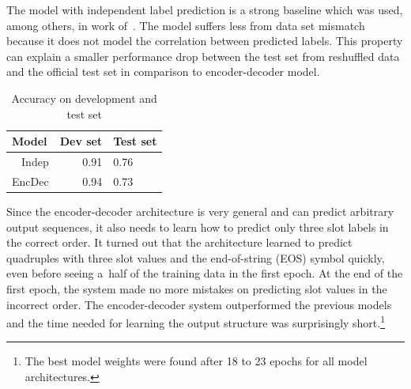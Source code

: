 \documentclass{itatnew}
\def\OD#1{{\color{darkgreen}OD: \it #1}}
\begin{document}
The model with independent label prediction is a strong baseline which was used, among others, in work of~\cite{zilka2015incremental}.
The model suffers less from data set mismatch because it does not model the correlation between predicted labels.
This property can explain a smaller performance drop between the test set from reshuffled data and the official test set in comparison to encoder-decoder model.

\begin{table}
\begin{center}
\begin{tabular}{r@{\quad}rll}
\hline
\multicolumn{1}{l}{\rule{0pt}{12pt}
                   Model}&\multicolumn{1}{l}{Dev set}&\multicolumn{2}{l}{Test set}\\[2pt]
\hline\rule{0pt}{12pt}
Indep  &   0.91 & 0.76 \\
EncDec &   0.94 & 0.73 \\
\hline
\end{tabular}
\caption{Accuracy on development and test set}
\vspace{-2em}
\end{center}
\label{tab:dstc}
\end{table}


Since the encoder-decoder architecture is very general and can predict arbitrary output sequences, it also needs to learn how to predict only three slot labels in the correct order.
It turned out that the architecture learned to predict quadruples with three slot values and the end-of-string (EOS) symbol quickly, even before seeing a~half of the training data in the first epoch.
At the end of the first epoch, the system made no more mistakes on predicting slot values in the incorrect order.
The encoder-decoder system 
outperformed the previous models and the time needed for learning the output structure was surprisingly short.\footnote{The best model weights were found after 18 to 23 epochs for all model architectures.}
\end{document}
